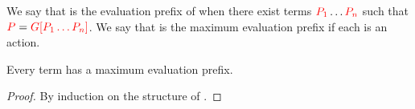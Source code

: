 \begin{definition}\label{def:cp-maximum-evaluation-prefix}
  We say that  is the evaluation prefix of  when there exist terms
  $\textcolor{red}{P_1} \dots \textcolor{red}{P_n}$ such that $\textcolor{red}{P} = \textcolor{red}{{G}[{P_1 \dots P_n}]}$.
  We say that  is the maximum evaluation prefix if each  is an
  action. 
\end{definition}
\begin{lemma}\label{thm:cp-maximum-evaluation-prefix}
  Every term  has a maximum evaluation prefix.
\end{lemma}
\begin{proof}
  By induction on the structure of .
\end{proof}
